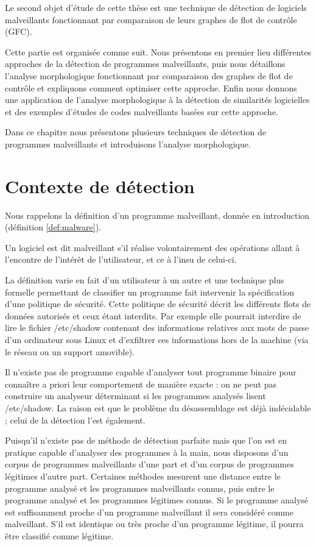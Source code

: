 Le second objet d'étude de cette thèse est une technique de détection de logiciels malveillants fonctionnant par comparaison de leurs graphes de flot de contrôle (GFC).

Cette partie est organisée comme suit.
Nous présentons en premier lieu différentes approches de la détection de programmes malveillants, puis nous détaillons l'analyse morphologique fonctionnant par comparaison des graphes de flot de contrôle et expliquons comment optimiser cette approche. Enfin nous donnons une application de l'analyse morphologique à la détection de similarités logicielles et des exemples d'études de codes malveillants basées sur cette approche.

Dans ce chapitre nous présentons plusieurs techniques de détection de programmes malveillants et introduisons l'analyse morphologique.

\section{Contexte de détection}
Nous rappelons la définition d'un programme malveillant, donnée en introduction (définition \ref{def:malware}).

\begin{defi}
Un logiciel est dit malveillant s'il réalise volontairement des opérations allant à l'encontre de l'intérêt de l'utilisateur, et ce à l'insu de celui-ci.
\label{def:malware}
\end{defi}

La définition varie en fait d'un utilisateur à un autre et une technique plus formelle permettant de classifier un programme fait intervenir la spécification d'une politique de sécurité. 
Cette politique de sécurité décrit les différents flots de données autorisés et ceux étant interdits. Par exemple elle pourrait interdire de lire le fichier /etc/shadow contenant des informations relatives aux mots de passe d'un ordinateur sous Linux et d'exfiltrer ces informations hors de la machine (via le réseau ou un support amovible).

Il n'existe pas de programme capable d'analyser tout programme binaire pour connaître a priori leur comportement de manière exacte : on ne peut pas construire un analyseur déterminant si les programmes analysés lisent /etc/shadow.
La raison est que le problème du désassemblage est déjà indécidable ; celui de la détection l'est également.

Puisqu'il n'existe pas de méthode de détection parfaite mais que l'on est en pratique capable d'analyser des programmes à la main, nous disposons d'un corpus de programmes malveillants d'une part et d'un corpus de programmes légitimes d'autre part.
Certaines méthodes mesurent une distance entre le programme analysé et les programmes malveillants connus, puis entre le programme analysé et les programmes légitimes connus. Si le programme analysé est suffisamment proche d'un programme malveillant il sera considéré comme malveillant. S'il est identique ou très proche d'un programme légitime, il pourra être classifié comme légitime.

